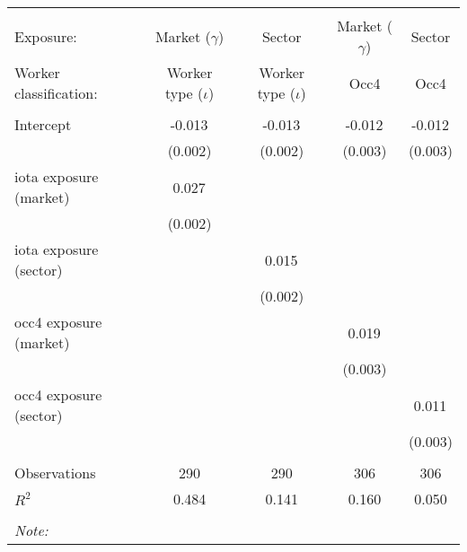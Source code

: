 \begin{tabular}{@{\extracolsep{5pt}}lcccc}
\\[-1.8ex]\hline
\hline \\[-1.8ex]
\hline \\[-1.8ex]
 Exposure: & Market ($\gamma$) & Sector & Market ($\gamma$) & Sector \\
 Worker classification: & Worker type ($\iota$) & Worker type ($\iota$) & Occ4 & Occ4 \\
 \hline &  &  &  &  \\
 Intercept & -0.013$^{}$ & -0.013$^{}$ & -0.012$^{}$ & -0.012$^{}$ \\
  & (0.002) & (0.002) & (0.003) & (0.003) \\
 iota exposure (market) & 0.027$^{}$ & & & \\
  & (0.002) & & & \\
 iota exposure (sector) & & 0.015$^{}$ & & \\
  & & (0.002) & & \\
 occ4 exposure (market) & & & 0.019$^{}$ & \\
  & & & (0.003) & \\
 occ4 exposure (sector) & & & & 0.011$^{}$ \\
  & & & & (0.003) \\
\hline \\[-1.8ex]
 Observations & 290 & 290 & 306 & 306 \\
 $R^2$ & 0.484 & 0.141 & 0.160 & 0.050 \\
\hline
\hline \\[-1.8ex]
\textit{Note:}\end{tabular}
